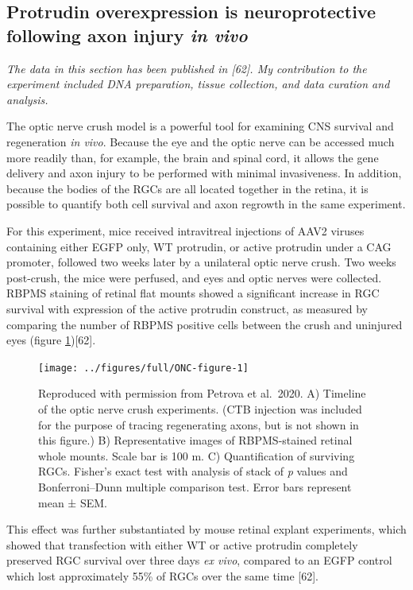 \documentclass[
  12pt,
  a4paper,
]{book}
\begin{document}
\subsection{\texorpdfstring{Protrudin overexpression is neuroprotective following axon injury \emph{in vivo}}{Protrudin overexpression is neuroprotective following axon injury in vivo}}\label{protrudin-ONC}

\emph{The data in this section has been published in {[}62{]}. My contribution to the experiment included DNA preparation, tissue collection, and data curation and analysis.}

The optic nerve crush model is a powerful tool for examining CNS survival and regeneration \emph{in vivo}. Because the eye and the optic nerve can be accessed much more readily than, for example, the brain and spinal cord, it allows the gene delivery and axon injury to be performed with minimal invasiveness. In addition, because the bodies of the RGCs are all located together in the retina, it is possible to quantify both cell survival and axon regrowth in the same experiment.

For this experiment, mice received intravitreal injections of AAV2 viruses containing either EGFP only, WT protrudin, or active protrudin under a CAG promoter, followed two weeks later by a unilateral optic nerve crush. Two weeks post-crush, the mice were perfused, and eyes and optic nerves were collected. RBPMS staining of retinal flat mounts showed a significant increase in RGC survival with expression of the active protrudin construct, as measured by comparing the number of RBPMS positive cells between the crush and uninjured eyes (figure \ref{fig:ONC-figure}){[}62{]}.



\begin{figure}
\texttt{[image: ../figures/full/ONC-figure-1]} \caption[RGC neuroprotection experiment from Petrova et al. 2020]{Reproduced with permission from Petrova et al.~2020. A) Timeline of the optic nerve crush experiments. (CTB injection was included for the purpose of tracing regenerating axons, but is not shown in this figure.) B) Representative images of RBPMS-stained retinal whole mounts. Scale bar is 100 \textmu{}m. C) Quantification of surviving RGCs. Fisher's exact test with analysis of stack of \emph{p} values and Bonferroni--Dunn multiple comparison test. Error bars represent mean ± SEM.}\label{fig:ONC-figure}
\end{figure}

This effect was further substantiated by mouse retinal explant experiments, which showed that transfection with either WT or active protrudin completely preserved RGC survival over three days \emph{ex vivo}, compared to an EGFP control which lost approximately 55\% of RGCs over the same time {[}62{]}.
\end{document}
